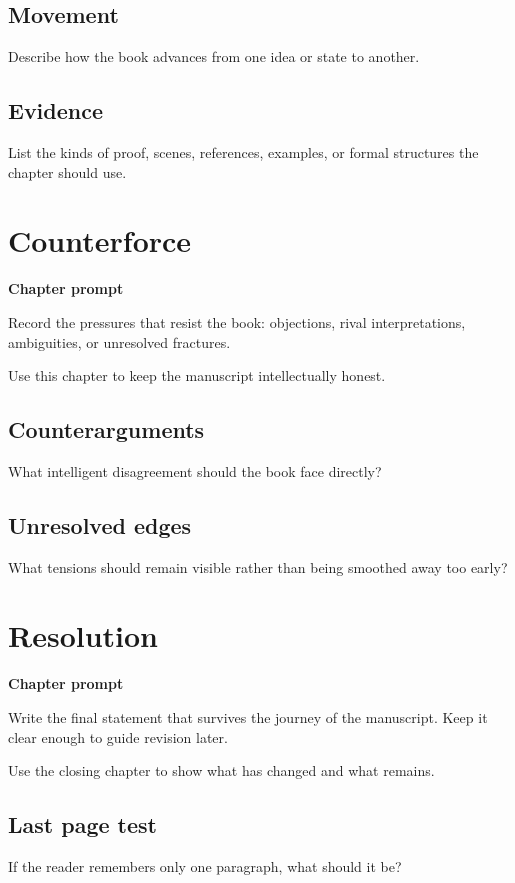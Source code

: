 \documentclass[11pt,openany]{book}
\newcommand{\chapterprompt}[1]{
\begin{chapterbox}
\textbf{Chapter prompt}\par
#1
\end{chapterbox}
}
\begin{document}
\section{Movement}

Describe how the book advances from one idea or state to another.

\section{Evidence}

List the kinds of proof, scenes, references, examples, or formal structures the chapter should use.

\chapter{Counterforce}
\chapterprompt{Record the pressures that resist the book: objections, rival interpretations, ambiguities, or unresolved fractures.}

Use this chapter to keep the manuscript intellectually honest.

\section{Counterarguments}

What intelligent disagreement should the book face directly?

\section{Unresolved edges}

What tensions should remain visible rather than being smoothed away too early?

\chapter{Resolution}
\chapterprompt{Write the final statement that survives the journey of the manuscript. Keep it clear enough to guide revision later.}

Use the closing chapter to show what has changed and what remains.

\section{Last page test}

If the reader remembers only one paragraph, what should it be?
\end{document}
